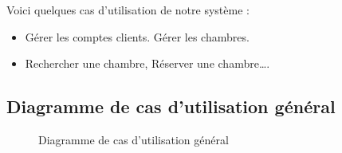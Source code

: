 \documentclass[12pt]{report}
\begin{document}
Voici quelques cas d’utilisation de notre système :

\begin{itemize}
    \item Gérer les comptes clients. Gérer les chambres.
    \item Rechercher une chambre, Réserver une chambre….
\end{itemize}


\subsection{Diagramme de cas d’utilisation général}

\begin{figure}[h]
\centering
  \vspace{-0.1in}
    \centerline{}
    \caption{Diagramme de cas d’utilisation général}
\end{figure}
\end{document}
